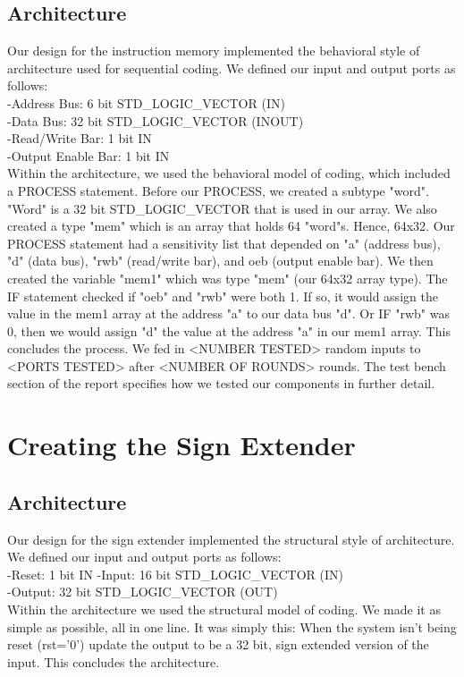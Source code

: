 \documentclass[paper=letter, fontsize=11pt]{scrartcl}
\numberwithin{equation}{section} %
\numberwithin{figure}{section} %
\numberwithin{table}{section} %
\begin{document}
\subsection{Architecture}
\begin{flushleft}
	Our design for the instruction memory implemented the behavioral style of architecture used for sequential coding. We defined our input and output ports as follows: \\
	-Address Bus: 6 bit STD\_LOGIC\_VECTOR (IN)\\
	-Data Bus: 32 bit STD\_LOGIC\_VECTOR (INOUT)\\
	-Read/Write Bar: 1 bit IN\\
	-Output Enable Bar: 1 bit IN \\[10pt]
	
	Within the architecture, we used the behavioral model of coding, which included a PROCESS statement. Before our PROCESS, we created a subtype "word". "Word" is a 32 bit STD\_LOGIC\_VECTOR that is used in our array. We also created a type "mem" which is an array that holds 64 "word"s. Hence, 64x32. Our PROCESS statement had a sensitivity list that depended on "a" (address bus), "d" (data bus), "rwb" (read/write bar), and oeb (output enable bar). We then created the variable "mem1" which was type "mem" (our 64x32 array type). The IF statement checked if "oeb" and "rwb" were both 1. If so, it would assign the value in the mem1 array at the address "a" to our data bus "d". Or IF "rwb" was 0, then we would assign "d" the value at the address "a" in our mem1 array. This concludes the process. We fed in <NUMBER TESTED> random inputs to <PORTS TESTED> after <NUMBER OF ROUNDS> rounds. The test bench section of the report specifies how we tested our components in further detail. \\[20pt]      
\end{flushleft}

\section{Creating the Sign Extender}

\subsection{Architecture}
\begin{flushleft}
	Our design for the sign extender implemented the structural style of architecture. We defined our input and output ports as follows:\\
	-Reset: 1 bit IN
	-Input: 16 bit STD\_LOGIC\_VECTOR (IN)\\
	-Output: 32 bit STD\_LOGIC\_VECTOR (OUT)\\[10pt]
	
	Within the architecture we used the structural model of coding. We made it as simple as possible, all in one line. It was simply this: When the system isn't being reset (rst='0') update the output to be a 32 bit, sign extended version of the input. This concludes the architecture. \\[20pt]      
\end{flushleft}
\end{document}

